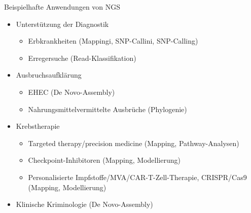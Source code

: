 \begin{frame}{Beispielhafte Anwendungen von NGS}
	\begin{itemize}
		\item Unterstützung der Diagnostik
		\begin{itemize}
			\item<2-> Erbkrankheiten (Mappingi, SNP-Callini, SNP-Calling)
			\item<3-> Erregersuche (Read-Klassifikation)
		\end{itemize}
		\item<4-> Ausbruchsaufklärung
		\begin{itemize}
			\item<4-> EHEC (De Novo-Assembly)
			\item<5-> Nahrungsmittelvermittelte Ausbrüche (Phylogenie)
		\end{itemize}
		\item<6-> Krebstherapie
		\begin{itemize}
			\item<6-> Targeted therapy/precision medicine (Mapping, Pathway-Analysen)
			\item<7-> Checkpoint-Inhibitoren (Mapping, Modellierung)
			\item<8-> Personalisierte Impfstoffe/MVA/CAR-T-Zell-Therapie, CRISPR/Cas9 (Mapping, Modellierung)
		\end{itemize}
	\item<9-> Klinische Kriminologie (De Novo-Assembly)
	\end{itemize}
\end{frame}
